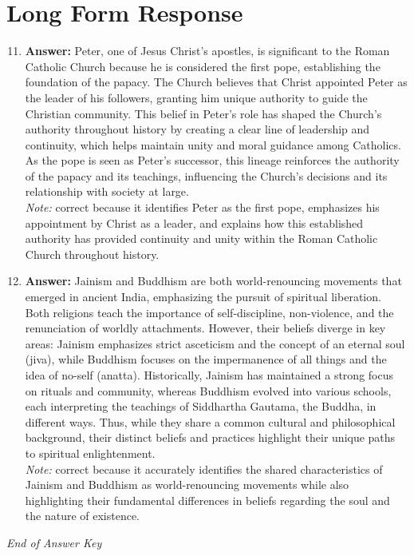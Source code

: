 \documentclass[12pt]{article}
\begin{document}
\section*{Long Form Response}
\begin{enumerate}[label=\arabic*.]
\setcounter{enumi}{10}
\item \textbf{Answer:} Peter, one of Jesus Christ's apostles, is significant to the Roman Catholic Church because he is considered the first pope, establishing the foundation of the papacy. The Church believes that Christ appointed Peter as the leader of his followers, granting him unique authority to guide the Christian community. This belief in Peter's role has shaped the Church's authority throughout history by creating a clear line of leadership and continuity, which helps maintain unity and moral guidance among Catholics. As the pope is seen as Peter's successor, this lineage reinforces the authority of the papacy and its teachings, influencing the Church's decisions and its relationship with society at large.
\\ \textit{Note:} correct because it identifies Peter as the first pope, emphasizes his appointment by Christ as a leader, and explains how this established authority has provided continuity and unity within the Roman Catholic Church throughout history.
\item \textbf{Answer:} Jainism and Buddhism are both world-renouncing movements that emerged in ancient India, emphasizing the pursuit of spiritual liberation. Both religions teach the importance of self-discipline, non-violence, and the renunciation of worldly attachments. However, their beliefs diverge in key areas: Jainism emphasizes strict asceticism and the concept of an eternal soul (jiva), while Buddhism focuses on the impermanence of all things and the idea of no-self (anatta). Historically, Jainism has maintained a strong focus on rituals and community, whereas Buddhism evolved into various schools, each interpreting the teachings of Siddhartha Gautama, the Buddha, in different ways. Thus, while they share a common cultural and philosophical background, their distinct beliefs and practices highlight their unique paths to spiritual enlightenment.
\\ \textit{Note:} correct because it accurately identifies the shared characteristics of Jainism and Buddhism as world-renouncing movements while also highlighting their fundamental differences in beliefs regarding the soul and the nature of existence.
\end{enumerate}

\vfill
\noindent\textit{End of Answer Key}
\end{document}
